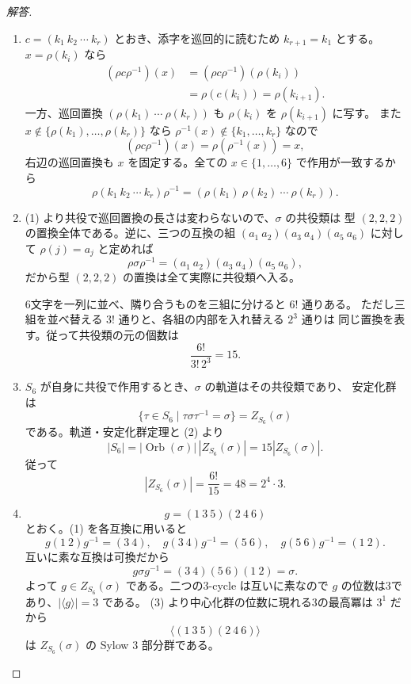 \begin{proof}[解答]
\begin{enumerate}
  \item[(1)] $c=(k_1\ k_2\ \cdots\ k_r)$ とおき、添字を巡回的に読むため
  $k_{r+1}=k_1$ とする。$x=\rho(k_i)$ なら
  \begin{align*}
  (\rho c\rho^{-1})(x)
  &=(\rho c\rho^{-1})(\rho(k_i))\\
  &=\rho(c(k_i))
  =\rho(k_{i+1}).
  \end{align*}
  一方、巡回置換 $(\rho(k_1)\ \cdots\ \rho(k_r))$ も
  $\rho(k_i)$ を $\rho(k_{i+1})$ に写す。
  また $x\notin\{\rho(k_1),\ldots,\rho(k_r)\}$ なら
  $\rho^{-1}(x)\notin\{k_1,\ldots,k_r\}$ なので
  \[
  (\rho c\rho^{-1})(x)=\rho(\rho^{-1}(x))=x,
  \]
  右辺の巡回置換も $x$ を固定する。全ての $x\in\{1,\ldots,6\}$ で作用が一致するから
  \[
  \rho(k_1\ k_2\ \cdots\ k_r)\rho^{-1}
  =(\rho(k_1)\ \rho(k_2)\ \cdots\ \rho(k_r)).
  \]

  \item[(2)] (1) より共役で巡回置換の長さは変わらないので、$\sigma$ の共役類は
  型 $(2,2,2)$ の置換全体である。逆に、三つの互換の組
  $(a_1\ a_2)(a_3\ a_4)(a_5\ a_6)$ に対して
  $\rho(j)=a_j$ と定めれば
  \[
  \rho\sigma\rho^{-1}=(a_1\ a_2)(a_3\ a_4)(a_5\ a_6),
  \]
  だから型 $(2,2,2)$ の置換は全て実際に共役類へ入る。

  6文字を一列に並べ、隣り合うものを三組に分けると $6!$ 通りある。
  ただし三組を並べ替える $3!$ 通りと、各組の内部を入れ替える $2^3$ 通りは
  同じ置換を表す。従って共役類の元の個数は
  \[
  \frac{6!}{3!\,2^3}=15.
  \]

  \item[(3)] $S_6$ が自身に共役で作用するとき、$\sigma$ の軌道はその共役類であり、
  安定化群は
  \[
  \{\tau\in S_6\mid\tau\sigma\tau^{-1}=\sigma\}
  =Z_{S_6}(\sigma)
  \]
  である。軌道・安定化群定理と (2) より
  \[
  |S_6|=|\operatorname{Orb}(\sigma)|\,|Z_{S_6}(\sigma)|
  =15|Z_{S_6}(\sigma)|.
  \]
  従って
  \[
  |Z_{S_6}(\sigma)|=\frac{6!}{15}=48=2^4\cdot3.
  \]

  \item[(4)]
  \[
  g=(1\ 3\ 5)(2\ 4\ 6)
  \]
  とおく。(1) を各互換に用いると
  \[
  g(1\ 2)g^{-1}=(3\ 4),\quad
  g(3\ 4)g^{-1}=(5\ 6),\quad
  g(5\ 6)g^{-1}=(1\ 2).
  \]
  互いに素な互換は可換だから
  \[
  g\sigma g^{-1}=(3\ 4)(5\ 6)(1\ 2)=\sigma.
  \]
  よって $g\in Z_{S_6}(\sigma)$ である。二つの3-cycle は互いに素なので
  $g$ の位数は3であり、$|\langle g\rangle|=3$ である。
  (3) より中心化群の位数に現れる3の最高冪は $3^1$ だから
  \[
  \langle(1\ 3\ 5)(2\ 4\ 6)\rangle
  \]
  は $Z_{S_6}(\sigma)$ の Sylow $3$ 部分群である。


\end{enumerate}
\end{proof}
